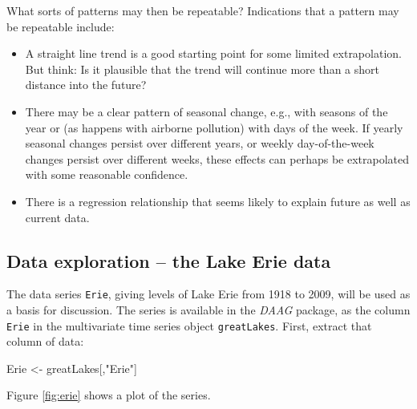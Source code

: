 \documentclass{tufte-book}\usepackage[]{graphicx}\usepackage[]{color}
\newcommand{\txtt}[1]{\texttt{#1}}
\begin{document}
What sorts of patterns may then be repeatable?  Indications that a
pattern may be repeatable include:
\begin{itemize}
\item A straight line trend is a good starting point for some
  limited extrapolation. But think: Is it plausible that the trend
  will continue more than a short distance into the future?
\item There may be a clear pattern of seasonal change, e.g.,
with seasons of the year or (as happens with airborne pollution)
with days of the week. If yearly seasonal changes persist over
different years, or weekly day-of-the-week changes persist over
different weeks, these effects can perhaps be extrapolated with
some reasonable confidence.
\item There is a regression relationship that seems likely to
explain future as well as current data.
\end{itemize}

\subsection{Data exploration -- the Lake Erie data}

The data series \txtt{Erie}, giving levels of Lake Erie
from 1918 to 2009, will be used as a basis for discussion.
    The series is available in the
    \textit{DAAG} package, as the column \txtt{Erie} in the
    multivariate time series object \txtt{greatLakes}.
First, extract that column of data:
\begin{Schunk}
\begin{Sinput}
Erie <- greatLakes[,"Erie"]
\end{Sinput}
\end{Schunk}

Figure \ref{fig:erie} shows a plot of the series.
\end{document}
